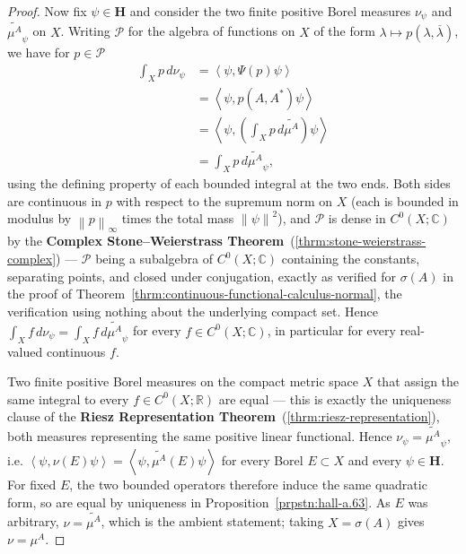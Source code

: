 \begin{proof}
Now fix $\psi \in \mathbf{H}$ and consider the two finite positive Borel measures $\nu_\psi$ and $\widetilde{\mu^A}_\psi$ on $X$. Writing $\mathcal{P}$ for the algebra of functions on $X$ of the form $\lambda \mapsto p(\lambda,\overline\lambda)$, we have for $p \in \mathcal{P}$
\begin{align}
    \int_X p \, d\nu_\psi &= \left< \psi, \Psi(p)\psi \right> \\
                &= \left< \psi, p(A,A^*)\psi \right> \\
                &= \left< \psi, \left( \int_X p \, d\widetilde{\mu^A} \right)\psi \right> \\
                &= \int_X p \, d\widetilde{\mu^A}_\psi,
\end{align}
using the defining property of each bounded integral at the two ends. Both sides are continuous in $p$ with respect to the supremum norm on $X$ (each is bounded in modulus by $\left\| p \right\|_\infty$ times the total mass $\left\| \psi \right\|^2$), and $\mathcal{P}$ is dense in $C^0(X;\mathbb{C})$ by the \textbf{Complex Stone–Weierstrass Theorem}~(\ref{thrm:stone-weierstrass-complex}) — $\mathcal{P}$ being a subalgebra of $C^0(X;\mathbb{C})$ containing the constants, separating points, and closed under conjugation, exactly as verified for $\sigma(A)$ in the proof of Theorem~\ref{thrm:continuous-functional-calculus-normal}, the verification using nothing about the underlying compact set. Hence $\int_X f \, d\nu_\psi = \int_X f \, d\widetilde{\mu^A}_\psi$ for every $f \in C^0(X;\mathbb{C})$, in particular for every real-valued continuous $f$.

Two finite positive Borel measures on the compact metric space $X$ that assign the same integral to every $f \in C^0(X;\mathbb{R})$ are equal — this is exactly the uniqueness clause of the \textbf{Riesz Representation Theorem}~(\ref{thrm:riesz-representation}), both measures representing the same positive linear functional. Hence $\nu_\psi = \widetilde{\mu^A}_\psi$, i.e. $\left< \psi, \nu(E)\psi \right> = \left< \psi, \widetilde{\mu^A}(E)\psi \right>$ for every Borel $E \subset X$ and every $\psi \in \mathbf{H}$. For fixed $E$, the two bounded operators therefore induce the same quadratic form, so are equal by uniqueness in Proposition~\ref{prpstn:hall-a.63}. As $E$ was arbitrary, $\nu = \widetilde{\mu^A}$, which is the ambient statement; taking $X = \sigma(A)$ gives $\nu = \mu^A$.
\end{proof}

